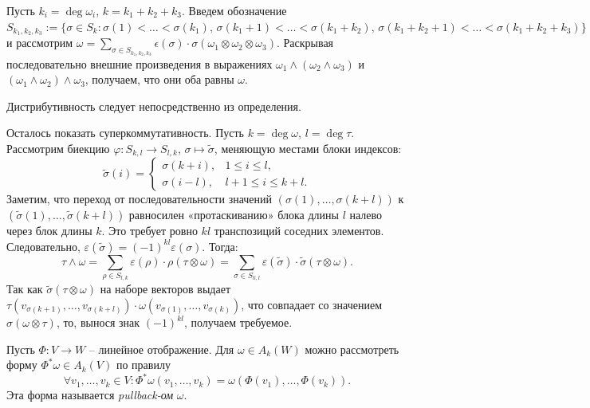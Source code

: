 \begin{myproof}
	Пусть $k_i = \deg \omega_i$, $k = k_1 + k_2 + k_3$. 
	Введем обозначение 
	$S_{k_1, k_2, k_3} := \{\sigma \in S_k : \sigma(1) < \dotsc < \sigma(k_1), \, \sigma(k_1 + 1) < \dotsc < \sigma(k_1 + k_2), \, \sigma(k_1 + k_2 + 1) < \dotsc < \sigma(k_1 + k_2 + k_3) \}$
	и рассмотрим $\omega = \sum_{\sigma \in S_{k_1, k_2, k_3}} \epsilon(\sigma) \cdot \sigma(\omega_1 \otimes \omega_2 \otimes \omega_3)$.
	Раскрывая последовательно внешние произведения в выражениях $\omega_1 \wedge (\omega_2 \wedge \omega_3)$ и $(\omega_1 \wedge \omega_2) \wedge \omega_3$, получаем, что они оба равны $\omega$.

	\vspace{5pt}
	Дистрибутивность следует непосредственно из определения.

	\vspace{5pt}
	Осталось показать суперкоммутативность.
	Пусть $k = \deg \omega$, $l = \deg \tau$. Рассмотрим биекцию $\varphi: S_{k, l} \to S_{l, k}$, $\sigma \mapsto \widetilde{\sigma}$, меняющую местами блоки индексов:
	\[ \widetilde{\sigma}(i) = \begin{cases} \sigma(k+i), & 1 \leq i \leq l, \\ \sigma(i-l), & l+1 \leq i \leq k+l. \end{cases} \]
	Заметим, что переход от последовательности значений $(\sigma(1), \dots, \sigma(k+l))$ к $(\widetilde{\sigma}(1), \dots, \widetilde{\sigma}(k+l))$ равносилен «протаскиванию» блока длины $l$ налево через блок длины $k$. Это требует ровно $kl$ транспозиций соседних элементов. Следовательно, $\varepsilon(\widetilde{\sigma}) = (-1)^{kl} \varepsilon(\sigma)$. %
	Тогда:
	\[ \tau \wedge \omega = \sum_{\rho \in S_{l, k}} \varepsilon(\rho) \cdot \rho(\tau \otimes \omega) = \sum_{\sigma \in S_{k, l}} \varepsilon(\widetilde{\sigma}) \cdot \widetilde{\sigma}(\tau \otimes \omega). \]
	Так как $\widetilde{\sigma}(\tau \otimes \omega)$ на наборе векторов выдает $\tau(v_{\sigma(k+1)}, \dotsc, v_{\sigma(k+l)}) \cdot \omega(v_{\sigma(1)}, \dotsc, v_{\sigma(k)})$, что совпадает со значением $\sigma(\omega \otimes \tau)$, то, вынося знак $(-1)^{kl}$, получаем требуемое.
\end{myproof}


\begin{definition}
	Пусть $\Phi : V \to W$ -- линейное отображение. 
	Для $\omega \in A_k(W)$ можно рассмотреть форму $\Phi^* \omega \in A_k(V)$ по правилу 
	\[ \forall v_1, \dotsc, v_k \in V : \Phi^* \omega (v_1, \dotsc, v_k) = \omega (\Phi(v_1), \dotsc, \Phi(v_k)). \]
	Эта форма называется \textit{pullback-ом} $\omega$.
\end{definition} 


